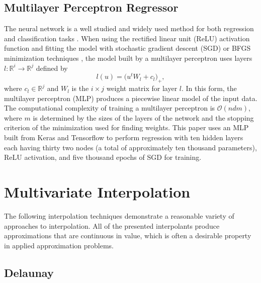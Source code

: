\documentclass[smallextended,final]{svjour3}  %
\begin{document}
\subsection{Multilayer Perceptron Regressor}
\label{sec:mlp}
The neural network is a well studied and widely used method for both
regression and classification tasks
\cite{hornik1989multilayer,rumelhart1988learning}. When using the
rectified linear unit (ReLU) activation function
\cite{dahl2013improving} and fitting the model with stochastic
gradient descent (SGD) or BFGS minimization techniques
\cite{goh2017why,moller1993scaled,robbins1951stochastic}, the model
built by a multilayer perceptron uses layers $l : \mathbb{R}^{i}
\rightarrow \mathbb{R}^{j}$ defined by
 $$ l(u) = \bigl( u^t W_l + c_l \bigr)_+ ,$$
where $c_l \in \mathbb{R}^j$ and $W_l$ is the $i \times j$ weight
matrix for layer $l$. In this form, the multilayer perceptron (MLP)
produces a piecewise linear model of the input data. The computational
complexity of training a multilayer perceptron is $\mathcal{O}(n d
m)$, where $m$ is determined by the sizes of the layers of the network
and the stopping criterion of the minimization used for finding
weights. This paper uses an MLP built from Keras and Tensorflow to
perform regression \cite{tensorflow2015-whitepaper,chollet2015keras}
with ten hidden layers each having thirty two nodes (a total of
approximately ten thousand parameters), ReLU activation, and five
thousand epochs of SGD for training.

\section{Multivariate Interpolation}
\label{sec:interpolation}
The following interpolation techniques demonstrate a reasonable
variety of approaches to interpolation. All of the presented
interpolants produce approximations that are continuous in value,
which is often a desirable property in applied approximation problems.

\subsection{Delaunay}
\label{sec:delaunay}
\end{document}
